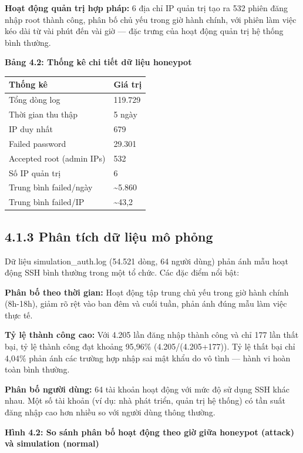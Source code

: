 \documentclass[
  a4paper]{report}
\newcounter{none} %
\begin{document}
\textbf{Hoạt động quản trị hợp pháp:} 6 địa chỉ IP quản trị tạo ra 532
phiên đăng nhập root thành công, phân bố chủ yếu trong giờ hành chính,
với phiên làm việc kéo dài từ vài phút đến vài giờ --- đặc trưng của
hoạt động quản trị hệ thống bình thường.

\textbf{Bảng 4.2: Thống kê chi tiết dữ liệu honeypot}

{\def\LTcaptype{none} %
\begin{longtable}[]{@{}ll@{}}
\toprule\noalign{}
Thống kê & Giá trị \\
\midrule\noalign{}
\endhead
\bottomrule\noalign{}
\endlastfoot
Tổng dòng log & 119.729 \\
Thời gian thu thập & 5 ngày \\
IP duy nhất & 679 \\
Failed password & 29.301 \\
Accepted root (admin IPs) & 532 \\
Số IP quản trị & 6 \\
Trung bình failed/ngày & \textasciitilde5.860 \\
Trung bình failed/IP & \textasciitilde43,2 \\
\end{longtable}
}

\subsection{4.1.3 Phân tích dữ liệu mô
phỏng}\label{phuxe2n-tuxedch-dux1eef-liux1ec7u-muxf4-phux1ecfng}

Dữ liệu simulation\_auth.log (54.521 dòng, 64 người dùng) phản ánh mẫu
hoạt động SSH bình thường trong một tổ chức. Các đặc điểm nổi bật:

\textbf{Phân bố theo thời gian:} Hoạt động tập trung chủ yếu trong giờ
hành chính (8h-18h), giảm rõ rệt vào ban đêm và cuối tuần, phản ánh đúng
mẫu làm việc thực tế.

\textbf{Tỷ lệ thành công cao:} Với 4.205 lần đăng nhập thành công và chỉ
177 lần thất bại, tỷ lệ thành công đạt khoảng 95,96\%
(4.205/(4.205+177)). Tỷ lệ thất bại chỉ 4,04\% phản ánh các trường hợp
nhập sai mật khẩu do vô tình --- hành vi hoàn toàn bình thường.

\textbf{Phân bố người dùng:} 64 tài khoản hoạt động với mức độ sử dụng
SSH khác nhau. Một số tài khoản (ví dụ: nhà phát triển, quản trị hệ
thống) có tần suất đăng nhập cao hơn nhiều so với người dùng thông
thường.

\textbf{Hình 4.2: So sánh phân bố hoạt động theo giờ giữa honeypot
(attack) và simulation (normal)}
\end{document}
